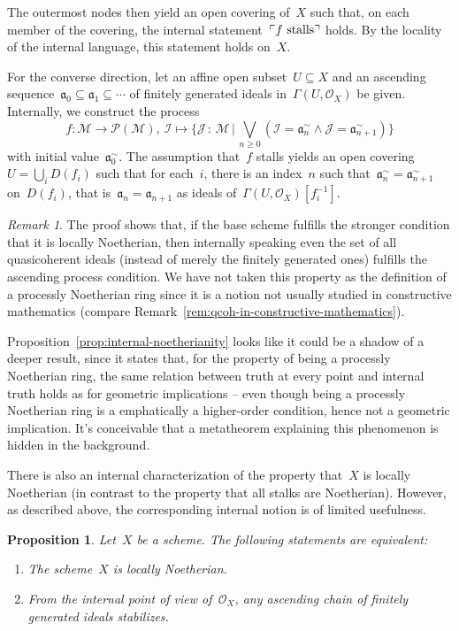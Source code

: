 \documentclass[10pt,reqno,a4paper]{amsbook}
\makeatletter
\theoremstyle{definition}
\theoremstyle{plain}
\newtheorem{prop}[defn]{Proposition}
\theoremstyle{remark}
\newtheorem{rem}[defn]{Remark}
\renewcommand{\O}{\mathcal{O}}
\newcommand{\M}{\mathcal{M}}
\renewcommand{\P}{\mathcal{P}}
\newcommand{\I}{\mathcal{I}}
\newcommand{\J}{\mathcal{J}}
\newcommand{\aaa}{\mathfrak{a}}
\newcommand{\?}{\,{:}\,}
\renewcommand{\_}{\mathpunct{.}\,}
\newcommand{\speak}[1]{\ulcorner\text{\textnormal{#1}}\urcorner}
\newcommand{\lra}{\longrightarrow}
\renewenvironment{proof}[1][\proofname]{\par
  \pushQED{\qed}%
  \normalfont \topsep6\p@\@plus6\p@\relax
  \trivlist
  \item[\hskip\labelsep
        \itshape
    #1\@addpunct{.}]\ignorespaces
}{%
  \popQED\endtrivlist\@endpefalse
}
\makeatother
\begin{document}
{\begin{proof}
The outermost nodes then yield an open covering of~$X$ such that, on each
member of the covering, the internal statement~$\speak{$f$ stalls}$ holds. By
the locality of the internal language, this statement holds on~$X$.

For the converse direction, let an affine open subset~$U \subseteq X$ and an
ascending sequence~$\aaa_0 \subseteq \aaa_1 \subseteq \cdots$ of finitely
generated ideals in~$\Gamma(U, \O_X)$ be given. Internally, we construct the
process
\[ f : \M \lra \P(\M),\ \I \longmapsto \{ \J \? \M \,|\,
  \bigvee_{n \geq 0} (\I = \aaa_n^\sim \wedge \J = \aaa_{n+1}^\sim) \} \]
with initial value~$\aaa_0^\sim$. The assumption that~$f$ stalls yields an open
covering~$U = \bigcup_i D(f_i)$ such that for each~$i$, there is an index~$n$
such that~$\aaa_n^\sim = \aaa_{n+1}^\sim$ on~$D(f_i)$, that is~$\aaa_n =
\aaa_{n+1}$ as ideals of~$\Gamma(U, \O_X)[f_i^{-1}]$.
\end{proof}

\begin{rem}The proof shows that, if the base scheme fulfills the stronger
condition that it is locally Noetherian, then internally speaking even the set
of all quasicoherent ideals (instead of merely the finitely generated
ones) fulfills the ascending process condition. We have not taken this property
as the definition of a processly Noetherian ring since it is a notion not
usually studied in constructive mathematics (compare
Remark~\ref{rem:qcoh-in-constructive-mathematics}).
\end{rem}

Proposition~\ref{prop:internal-noetherianity} looks like it could be a shadow
of a deeper result, since it states that, for the property of being a processly
Noetherian ring, the same relation between truth at every point and internal
truth holds as for geometric implications -- even though being a processly
Noetherian ring is a emphatically a higher-order condition, hence not a
geometric implication. It's conceivable that a metatheorem explaining this
phenomenon is hidden in the background.

There is also an internal characterization of the property that~$X$ is locally
Noetherian (in contrast to the property that all stalks are Noetherian).
However, as described above, the corresponding internal notion is of limited
usefulness.

\begin{prop}Let~$X$ be a scheme. The following statements are equivalent:
\begin{enumerate}
\item The scheme~$X$ is locally Noetherian.
\item From the internal point of view of~$\O_X$, any ascending chain of
finitely generated ideals stabilizes.
\end{enumerate}
\end{prop}

}
\end{document}
